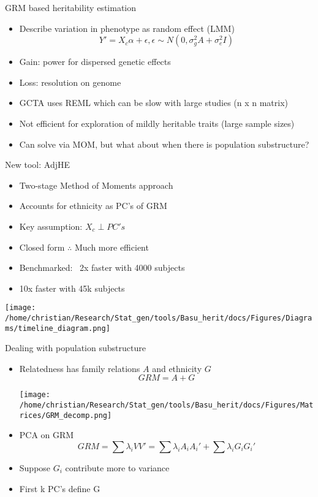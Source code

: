 \documentclass[
  ignorenonframetext,
]{beamer}
\begin{document}
\begin{frame}{GRM based heritability estimation}
\begin{itemize}
	\item Describe variation in phenotype as random effect (LMM)
		$$ Y' = X_c\alpha + \epsilon, \epsilon \sim N(0, \sigma_g^2 A + \sigma_e^2 I)$$
	\item Gain: power for dispersed genetic effects
	\item Loss: resolution on genome
	\item GCTA uses REML which can be slow with large studies (n x n matrix)
	\item Not efficient for exploration of mildly heritable traits (large sample sizes)
	\item Can solve via MOM, but what about when there is population substructure?
\end{itemize}
\end{frame}

\begin{frame}{New tool: AdjHE}
	\begin{itemize}
		\item Two-stage Method of Moments approach
		\item Accounts for ethnicity as PC's of GRM
		\item Key assumption: $X_c \perp PC's$
		\item Closed form $\therefore$ Much more efficient 
		\item Benchmarked: ~2x faster with 4000 subjects
		\item 10x faster with 45k subjects
	\end{itemize}
	 \texttt{[image: /home/christian/Research/Stat\_gen/tools/Basu\_herit/docs/Figures/Diagrams/timeline\_diagram.png]}
\end{frame}



\begin{frame}{Dealing with population substructure}
\begin{itemize}
	\item Relatedness has family relations $A$ and ethnicity $G$
	$$ GRM = A + G$$
	\begin{center}
		\texttt{[image: /home/christian/Research/Stat\_gen/tools/Basu\_herit/docs/Figures/Matrices/GRM\_decomp.png]}
	\end{center}
	\item PCA on GRM
	$$GRM = \sum \lambda_i VV' = \sum \lambda_i A_iA_i' + \sum \lambda_i G_iG_i' $$
	\item Suppose $G_i$ contribute more to variance
	\item First k PC's define G
\end{itemize}
\end{frame}
\end{document}
